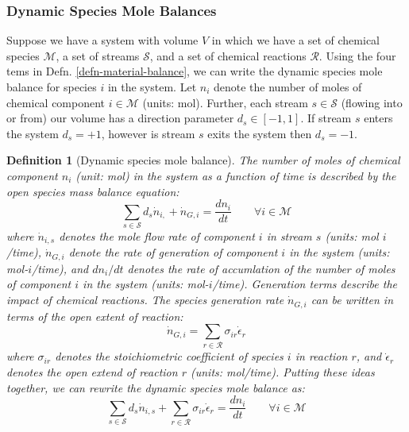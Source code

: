 \documentclass{article}[11pt]
\newtheorem{defn}{Definition}
\begin{document}
\subsubsection*{Dynamic Species Mole Balances}
Suppose we have a system with volume $V$ in which we have a set of chemical species $\mathcal{M}$, a set of streams $\mathcal{S}$, and a set of chemical reactions $\mathcal{R}$.
Using the four tems in Defn. \ref{defn-material-balance}, we can write the dynamic species mole balance for species $i$ in the system.
Let $n_{i}$ denote the number of moles of chemical component $i\in\mathcal{M}$ (units: mol).
Further, each stream $s\in\mathcal{S}$ (flowing into or from) our volume has a direction parameter $d_{s}\in\left[-1,1\right]$. 
If stream $s$ enters the system $d_{s} = +1$, however is stream $s$ exits the system then $d_{s} = -1$.

\begin{mdframed}
\begin{defn}[Dynamic species mole balance]\label{defn-dynamic-species-mole-balance}
The number of moles of chemical component $n_{i}$ (unit: mol) in the system as a function of time is described by the 
open species mass balance equation:
\begin{equation}\label{eqn-species-mol-balance}
\sum_{s\in\mathcal{S}}d_{s}\dot{n}_{i,} + \dot{n}_{G,i} = \frac{dn_{i}}{dt}
\qquad\forall{i}\in\mathcal{M}
\end{equation}
where $\dot{n}_{i,s}$ denotes the mole flow rate of component $i$ in stream $s$ (units: mol $i$/time),
$\dot{n}_{G,i}$ denote the rate of generation of component $i$ in the system 
(units: mol-$i$/time), and $dn_{i}/dt$ denotes the rate of accumlation of the number of moles of component $i$ in the system (units: mol-$i$/time). 
Generation terms describe the impact of chemical reactions.
The species generation rate $\dot{n}_{G,i}$ can be written in terms of the open extent of reaction:
\begin{equation}\label{eqn-open-extent-species}
\dot{n}_{G,i} = \sum_{r\in\mathcal{R}}\sigma_{ir}\dot{\epsilon}_{r}
\end{equation}
where $\sigma_{ir}$ denotes the stoichiometric coefficient of species $i$ in reaction $r$, and $\dot{\epsilon}_{r}$ denotes the open extend of reaction $r$ (units: mol/time).
Putting these ideas together, we can rewrite the dynamic species mole balance as:
\begin{equation}\label{eqn-dynamic-smb-with-extent}
\sum_{s\in\mathcal{S}}d_{s}\dot{n}_{i,s} + \sum_{r\in\mathcal{R}}\sigma_{ir}\dot{\epsilon}_{r} = \frac{dn_{i}}{dt}\qquad\forall{i\in\mathcal{M}}
\end{equation}
\end{defn}
\end{mdframed}
\end{document}
